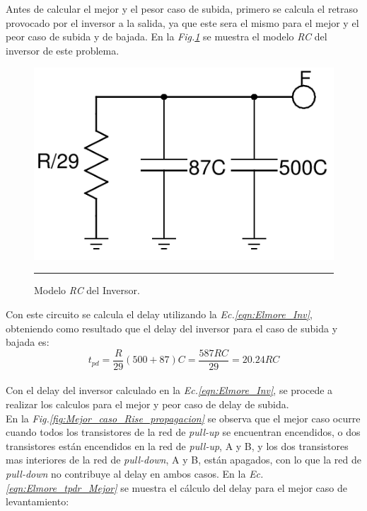 \documentclass[12pt,a4paper]{article} %
\begin{document}
Antes de calcular el mejor y el pesor caso de subida, primero se calcula el retraso provocado por el inversor a la salida, ya que este sera el mismo para el mejor y el peor caso de subida y de bajada. En la \textit{Fig.\ref{fig:RC_Inversor}} se muestra el modelo \textit{RC} del inversor de este problema.\\

\begin{figure}[htbp]
  \centering
    \includegraphics[scale=0.3]{./RC_Inversor.png}
    \rule{35em}{0.5pt}
  \caption[IdealvsSim]{Modelo \textit{RC} del Inversor.}
  \label{fig:RC_Inversor}
\end{figure}

Con este circuito se calcula el delay utilizando la \textit{Ec.\ref{eqn:Elmore_Inv}}, obteniendo como resultado que el delay del inversor para el caso de subida y bajada es:\\

\begin{equation}\label{eqn:Elmore_Inv}
t_{pd} = \frac{R}{29}(500 + 87)C = \frac{587RC}{29} = 20.24RC
\end{equation}\\

Con el delay del inversor calculado en la \textit{Ec.\ref{eqn:Elmore_Inv}}, se procede a realizar los calculos para el mejor y peor caso de delay de subida.\\

En la \textit{Fig.\ref{fig:Mejor_caso_Rise_propagacion}} se observa que el mejor caso ocurre cuando todos los transistores de la red de \textit{pull-up} se encuentran encendidos, o dos transistores están encendidos en la red de \textit{pull-up}, A y B, y los dos transistores mas interiores de la red de \textit{pull-down}, A y B, están apagados, con lo que la red de \textit{pull-down} no contribuye al delay en ambos casos. En la \textit{Ec.\ref{eqn:Elmore_tpdr_Mejor}} se muestra el cálculo del delay para el mejor caso de levantamiento:\\
\end{document}
